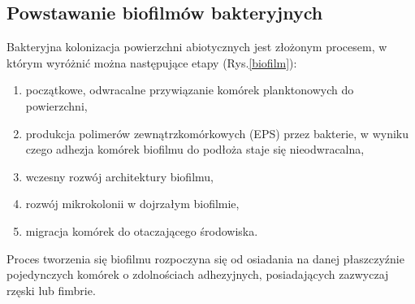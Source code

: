 \documentclass[11pt,a4paper]{report}
\begin{document}
\subsection{Powstawanie biofilmów bakteryjnych}
Bakteryjna kolonizacja powierzchni abiotycznych jest złożonym procesem, w którym wyróżnić można następujące etapy (Rys.\ref{biofilm}):
\begin{enumerate}
\item początkowe, odwracalne przywiązanie komórek planktonowych do powierzchni,
\item produkcja polimerów zewnątrzkomórkowych (EPS) przez bakterie, w wyniku czego adhezja komórek biofilmu do podłoża staje się nieodwracalna,
\item wczesny rozwój architektury biofilmu,
\item rozwój mikrokolonii w dojrzałym biofilmie, %
\item migracja komórek do otaczającego środowiska\cite{czaczyk}.

\end{enumerate}

Proces tworzenia się biofilmu rozpoczyna się od osiadania na danej płaszczyźnie pojedynczych komórek o zdolnościach adhezyjnych, posiadających zazwyczaj rzęski lub fimbrie\cite{myszka, kolwzan}. 
\end{document}
